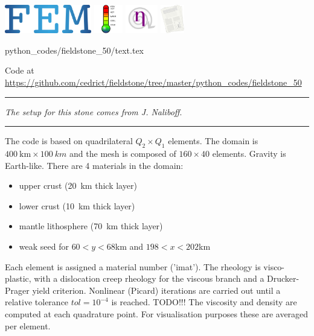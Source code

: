\includegraphics[height=1.25cm]{images/pictograms/FEM}
\includegraphics[height=1.25cm]{images/pictograms/temperature}
\includegraphics[height=1.25cm]{images/pictograms/nonlinear}
\includegraphics[height=1.25cm]{images/pictograms/publication}


\begin{flushright} {\tiny {\color{gray} python\_codes/fieldstone\_50/text.tex}} \end{flushright}



\begin{center}
Code at \url{https://github.com/cedrict/fieldstone/tree/master/python_codes/fieldstone_50}
\end{center}

\par\noindent\rule{\textwidth}{0.4pt}

{\sl The setup for this stone comes from J. Naliboff}. 
 

\par\noindent\rule{\textwidth}{0.4pt}


The code is based on quadrilateral $Q_2\times Q_1$ elements.
The domain is $400~\si{\km}\times 100~\si{km}$ and the 
mesh is composed of $160\times 40$ elements. Gravity is Earth-like.
There are 4 materials in the domain:
\begin{itemize}
\item upper crust (20~\si{\km} thick layer)
\item lower crust (10~\si{\km} thick layer)
\item mantle lithosphere (70~\si{\km} thick layer)
\item weak seed for $60<y<68$km and $198<x<202$km
\end{itemize}
Each element is assigned a material number ('imat'). 
The rheology is visco-plastic, with a dislocation creep rheology for the viscous branch and 
a Drucker-Prager yield criterion. Nonlinear (Picard) iterations are carried out until 
a relative tolerance $tol=10^{-4}$ is reached. TODO!!!
The viscosity and density are computed at each quadrature point.
For visualisation purposes these are averaged per element.
 
